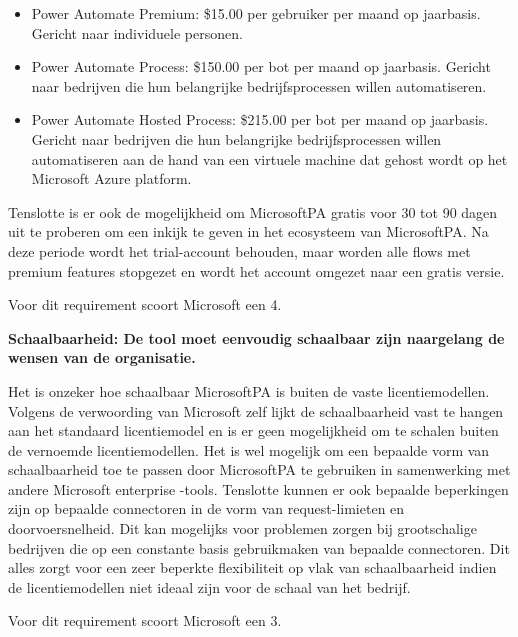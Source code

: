 \begin{itemize}
    \item Power Automate Premium: \$15.00 per gebruiker per maand op jaarbasis. Gericht naar individuele personen.
    \item Power Automate Process: \$150.00 per bot per maand op jaarbasis. Gericht naar bedrijven die hun belangrijke bedrijfsprocessen willen automatiseren.
    \item Power Automate Hosted Process: \$215.00 per bot per maand op jaarbasis. Gericht naar bedrijven die hun belangrijke bedrijfsprocessen willen automatiseren aan de hand van een virtuele machine dat gehost wordt op het Microsoft Azure platform.
\end{itemize}

Tenslotte is er ook de mogelijkheid om MicrosoftPA gratis voor 30 tot 90 dagen uit te proberen om een inkijk te geven in het ecosysteem van MicrosoftPA. Na deze periode wordt het trial-account behouden, maar worden alle flows met premium features stopgezet en wordt het account omgezet naar een gratis versie.

Voor dit requirement scoort Microsoft een 4.

\vspace{\baselineskip}

\textbf{Schaalbaarheid: De tool moet eenvoudig schaalbaar zijn naargelang de wensen van de organisatie.}

\vspace{\baselineskip}

Het is onzeker hoe schaalbaar MicrosoftPA is buiten de vaste licentiemodellen. Volgens de verwoording van Microsoft zelf lijkt de schaalbaarheid vast te hangen aan het standaard licentiemodel en is er geen mogelijkheid om te schalen buiten de vernoemde licentiemodellen. Het is wel mogelijk om een bepaalde vorm van schaalbaarheid toe te passen door MicrosoftPA te gebruiken in samenwerking met andere Microsoft enterprise -tools. Tenslotte kunnen er ook bepaalde beperkingen zijn op bepaalde connectoren in de vorm van request-limieten en doorvoersnelheid. Dit kan mogelijks voor problemen zorgen bij grootschalige bedrijven die op een constante basis gebruikmaken van bepaalde connectoren. Dit alles zorgt voor een zeer beperkte flexibiliteit op vlak van schaalbaarheid indien de licentiemodellen niet ideaal zijn voor de schaal van het bedrijf.


Voor dit requirement scoort Microsoft een 3.

\vspace{\baselineskip}

